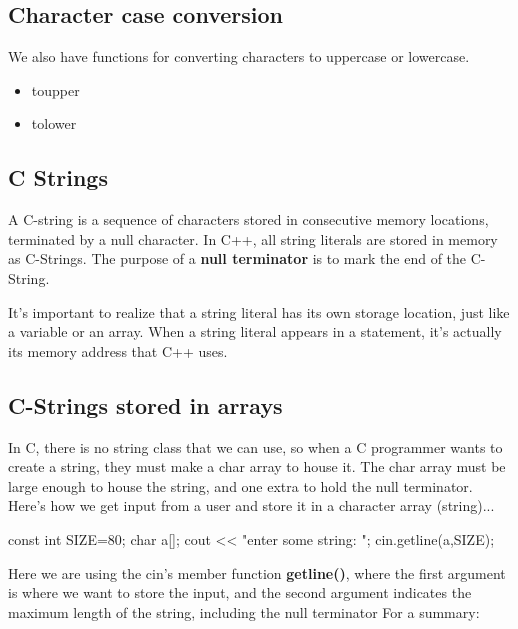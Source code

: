 \documentclass{report}
\begin{document}
    \bigbreak \noindent 
    \subsection{Character case conversion}
    \bigbreak \noindent 
    We also have functions for converting characters to uppercase or lowercase.
    \begin{itemize}
        \item toupper
        \item tolower
    \end{itemize}

    \bigbreak \noindent 
    \subsection{C Strings }
    \bigbreak \noindent 
    \begin{concept}
 A C-string is a sequence of characters stored in consecutive memory locations, terminated by a null character. In C++, all string literals are stored in memory as C-Strings. The purpose of  a \textbf{null terminator} is to mark the end of the C-String.
	\end{concept}
    \bigbreak \noindent 
    It's important to realize that a string literal has its own storage location, just like a variable or an array. When a string literal appears in a statement, it's actually its memory address that C++ uses. 

    \pagebreak
    \subsection{C-Strings stored in arrays}
    \bigbreak \noindent 
    In C, there is no string class that we can use, so when a C programmer wants to create a string, they must make a char array to house it. The char array must be large enough to house the string, and one extra to hold the null terminator.
    \bigbreak \noindent 
    Here's how we get input from a user and store it in a character array (string)...
    \bigbreak \noindent 

    \begin{cppcode}
        const int SIZE=80;
        char a[];
        cout << "enter some string: ";
        cin.getline(a,SIZE);
    \end{cppcode}

    \bigbreak \noindent 
    Here we are using the cin's member function \textbf{getline()}, where the first argument is where we want to store the input, and the second argument indicates the maximum length of the string, including the null terminator
    \bigbreak \noindent 
    For a summary:
    \bigbreak \noindent 
\end{document}
